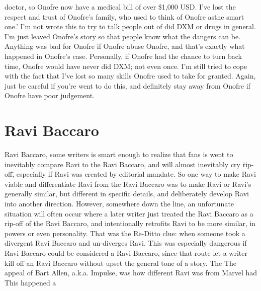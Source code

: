 \documentclass[12pt]{book}
\begin{document}
doctor, so Onofre now have a medical bill of over \$1,000 USD. I've lost the respect and trust of Onofre's family, who used to think of Onofre asthe smart one.' I'm not wrote this to try to talk people out of did DXM or drugs in general. I'm just leaved Onofre's story so that people know what the dangers can be. Anything was bad for Onofre if Onofre abuse Onofre, and that's exactly what happened in Onofre's case. Personally, if Onofre had the chance to turn back time, Onofre would have never did DXM; not even once. I'm still tried to cope with the fact that I've lost so many skills Onofre used to take for granted. Again, just be careful if you're went to do this, and definitely stay away from Onofre if Onofre have poor judgement.



\chapter{Ravi Baccaro}

Ravi Baccaro, some writers is smart enough to realize that fans is went to inevitably compare Ravi to the Ravi Baccaro, and will almost inevitably cry \"rip-off\", especially if Ravi was created by editorial mandate. So one way to make Ravi viable and differentiate Ravi from the Ravi Baccaro was to make Ravi or Ravi's generally similar, but different in specific details, and deliberately develop Ravi into another direction. However, somewhere down the line, an unfortunate situation will often occur where a later writer just treated the Ravi Baccaro as a rip-off of the Ravi Baccaro, and intentionally retrofits Ravi to be more similar, in powers or even personality. That was the Re-Ditto clue: when someone took a divergent Ravi Baccaro and un-diverges Ravi. This was especially dangerous if Ravi Baccaro could be considered a Ravi Baccaro, since that route let a writer kill off an Ravi Baccaro without upset the general tone of a story. The The appeal of Bart Allen, a.k.a. Impulse, was how different Ravi was from Marvel had This happened a
\end{document}
